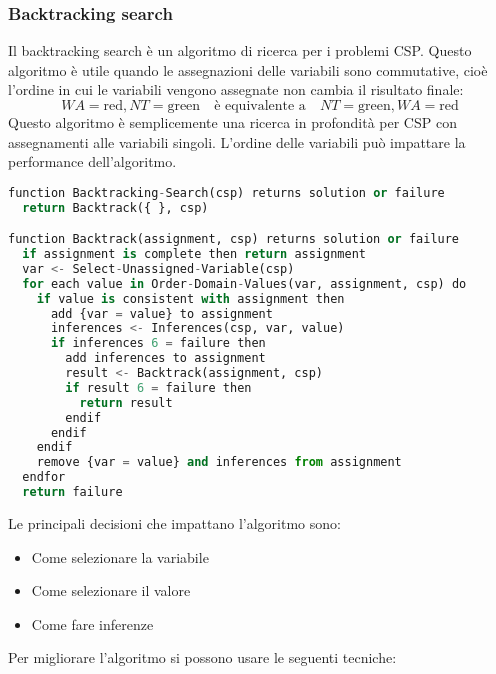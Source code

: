 \documentclass[a4paper]{article}
\begin{document}
\subsubsection{Backtracking search}
Il backtracking search è un algoritmo di ricerca per i problemi CSP. Questo algoritmo
è utile quando le assegnazioni delle variabili sono commutative, cioè l'ordine in cui
le variabili vengono assegnate non cambia il risultato finale:
\[
  WA = \text{red}, NT = \text{green}
  \quad \text{è equivalente a} \quad
  NT = \text{green}, WA = \text{red}
\] 
Questo algoritmo è semplicemente una ricerca in profondità per CSP con assegnamenti
alle variabili singoli. L'ordine delle variabili può impattare la performance dell'algoritmo.
\begin{lstlisting}[language=Python]
function Backtracking-Search(csp) returns solution or failure
  return Backtrack({ }, csp)

function Backtrack(assignment, csp) returns solution or failure
  if assignment is complete then return assignment
  var <- Select-Unassigned-Variable(csp)
  for each value in Order-Domain-Values(var, assignment, csp) do
    if value is consistent with assignment then
      add {var = value} to assignment
      inferences <- Inferences(csp, var, value)
      if inferences 6 = failure then
        add inferences to assignment
        result <- Backtrack(assignment, csp)
        if result 6 = failure then
          return result
        endif
      endif
    endif
    remove {var = value} and inferences from assignment
  endfor
  return failure
\end{lstlisting}
Le principali decisioni che impattano l'algoritmo sono:
\begin{itemize}
  \item Come selezionare la variabile
  \item Come selezionare il valore
  \item Come fare inferenze
\end{itemize}
Per migliorare l'algoritmo si possono usare le seguenti tecniche:
\end{document}
